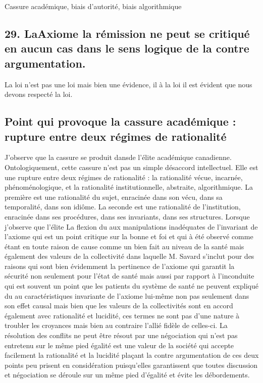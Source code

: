 \documentclass[12pt,letterpaper,oneside]{article}
\begin{document}
Cassure académique, biais d’autorité, biais algorithmique

\subsection*{29. LaAxiome la rémission ne peut se critiqué en aucun cas dans le sens logique de la contre argumentation.}
La loi n’est pas une loi mais bien une évidence, il à la loi il est évident que nous devons respecté la loi.

\subsection*{Point qui provoque la cassure académique : rupture entre deux régimes de rationalité}
J’observe que la cassure se produit dansde l’élite académique canadienne. Ontologiquement, cette cassure n’est pas un simple désaccord intellectuel. Elle est une rupture entre deux régimes de rationalité :
	la rationalité vécue, incarnée, phénoménologique,
	et la rationalité institutionnelle, abstraite, algorithmique.
La première est une rationalité du sujet, enracinée dans son vécu, dans sa temporalité, dans son idiôme. La seconde est une rationalité de l’institution, enracinée dans ses procédures, dans ses invariants, dans ses structures.
Lorsque j’observe que l’élite
La flexion du aux manipulations inadéquates de l’invariant de l’axiome qui est un point critique sur la bonne et foi et qui à été observé comme étant en toute raison de cause comme un bien fait au niveau de la santé mais également des valeurs de la collectivité dans laquelle M. Savard s’inclut pour des raisons qui sont bien évidemment la pertinence de l’axiome qui garantit la sécurité non seulement pour l’état de santé mais aussi par rapport à l’inconduite qui est souvent un point que les patients du système de santé ne peuvent  expliqué du au caractéristiques invariante  de l’axiome lui-même non pas seulement dans son effet causal mais bien que les valeurs de la collectivités sont en accord également avec rationalité et lucidité, ces termes ne sont pas d’une nature à troubler les croyances mais bien au contraire l’allié fidèle de celles-ci. La résolution des conflits ne peut être résout par une négociation qui n’est pas entretenu sur le même pied égalité est une valeur de la société qui accepte facilement la rationalité et la lucidité plaçant la contre argumentation de ces deux points peu prisent en considération puisqu’elles garantissent que toutes discussion et négociation se déroule sur un même pied d’égalité et évite les débordements.
\end{document}
